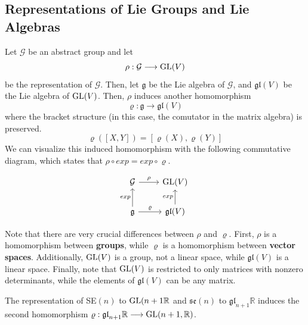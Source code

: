 \subsection{Representations of Lie Groups and Lie Algebras}

  Let $\mathcal{G}$ be an abstract group and let
  \begin{equation}
    \rho: \mathcal{G} \longrightarrow \operatorname{GL}(V)
  \end{equation}
  be the representation of $\mathcal{G}$. Then, let $\mathfrak{g}$ be the Lie algebra of $\mathcal{G}$, and $\mathfrak{gl}(V)$ be the Lie algebra of $\operatorname{GL}(V)$. Then, $\rho$ induces another homomorphism 
  \begin{equation}
    \varrho: \mathfrak{g} \longrightarrow \mathfrak{gl}(V)
  \end{equation}
  where the bracket structure (in this case, the comutator in the matrix algebra) is preserved. 
  \begin{equation}
    \varrho([X,Y]) = [\varrho(X), \varrho(Y)]
  \end{equation}
  We can visualize this induced homomorphism with the following commutative diagram, which states that $\rho \circ exp = exp \circ \varrho$. 

  \[\begin{tikzcd}
  \mathcal{G} \arrow{r}{\rho} & \GL(V)\\
  \mathfrak{g} \arrow{u}{exp} \arrow{r}{\varrho} & \mathfrak{gl}(V) \arrow{u}{exp}
  \end{tikzcd}\]

  Note that there are very crucial differences between $\rho$ and $\varrho$. First, $\rho$ is a homomorphism between \textbf{groups}, while $\varrho$ is a homomorphism between \textbf{vector spaces}. Additionally, $\operatorname{GL}(V)$ is a group, not a linear space, while $\mathfrak{gl}(V)$ is a linear space. Finally, note that $\operatorname{GL}(V)$ is restricted to only matrices with nonzero determinants, while the elements of $\mathfrak{gl}(V)$ can be any matrix. 

  \begin{example}
    The representation of SE$(n)$ to $\operatorname{GL}(n+1 \mathbb{R}$ and $\mathfrak{se}(n)$ to $\mathfrak{gl}_{n+1} \mathbb{R}$ induces the second homomorphism $\varrho: \mathfrak{gl}_{n+1} \mathbb{R} \longrightarrow \operatorname{GL}(n+1, \mathbb{R})$. 
  \end{example}

